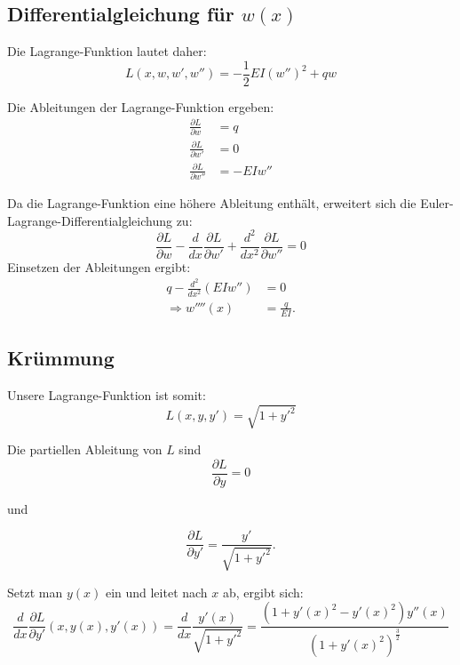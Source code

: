 \subsection{Differentialgleichung für $w(x)$}
Die Lagrange-Funktion lautet daher:
\begin{equation}
	L(x,w,w',w'') = -\frac{1}{2} E I (w'')^2 + q w
\end{equation}

Die Ableitungen der Lagrange-Funktion ergeben:
\begin{align}
	\frac{\partial L}{\partial w} &= q \\
	\frac{\partial L}{\partial w'} &= 0 \\
	\frac{\partial L}{\partial w''} &= -E I w''
\end{align}

Da die Lagrange-Funktion eine höhere Ableitung enthält, erweitert sich die Euler-Lagrange-Differentialgleichung zu:
\begin{equation}
	\frac{\partial L}{\partial w} - \frac{d}{dx} \frac{\partial L}{\partial w'} + \frac{d^2}{dx^2} \frac{\partial L}{\partial w''} = 0
\end{equation}
Einsetzen der Ableitungen ergibt:
	\begin{align}
		q - \frac{d^2}{dx^2}(E I w'') &= 0 \\
		\Rightarrow w''''(x) &= \frac{q}{E I}.
	\end{align}

\subsection{Krümmung}
Unsere Lagrange-Funktion ist somit:
\begin{equation}
	L(x,y,y') = \sqrt{1 + {y'}^2}
\end{equation}

Die partiellen Ableitung von $L$ sind
\begin{equation}
	\frac{\partial L}{\partial y} = 0
\end{equation}

und

\begin{equation}
	\frac{\partial L}{\partial y'} = \frac{y'}{\sqrt{1 + {y'}^2}}.
\end{equation}

Setzt man $y(x)$ ein und leitet nach $x$ ab, ergibt sich:
\begin{equation}
	\frac{d}{dx} \frac{\partial L}{\partial y'}(x,y(x),y'(x)) = \frac{d}{dx} \frac{y'(x)}{\sqrt{1 + {y'}^2}} = \frac{(1 + {y'(x)}^2 - {y'(x)}^2) y''(x)}{(1 + {y'(x)}^2)^{\frac{3}{2}}}
\end{equation}

